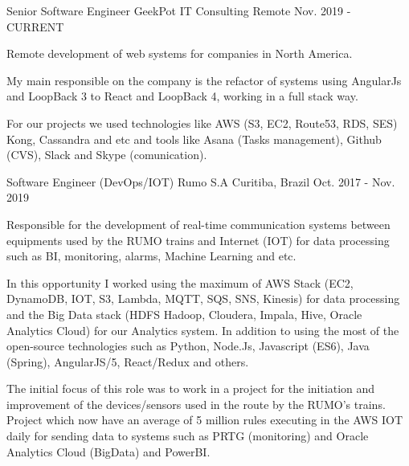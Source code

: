 

\begin{cventries}
  \cventry
    {Senior Software Engineer} %
    {GeekPot IT Consulting} %
    {Remote} %
    {Nov. 2019 - CURRENT} %
    {
    \begin{cvitems} %
        \item {
     Remote development of web systems for companies in North America.
       }
       \item {
       My main responsible on the company is the refactor of systems using AngularJs and LoopBack 3 to React and LoopBack 4, working in a full stack way.
       }
       \item {
       For our projects we used technologies like AWS (S3, EC2, Route53, RDS, SES) Kong, Cassandra and etc and tools like Asana (Tasks management), Github (CVS), Slack and Skype (comunication).
        }
      \end{cvitems}
    }
  \cventry
    { Software Engineer (DevOps/IOT)} %
    {Rumo S.A} %
    {Curitiba, Brazil} %
    {Oct. 2017 - Nov. 2019} %
    {
    \begin{cvitems} %
        \item {
Responsible for the development of real-time communication systems between equipments used by the RUMO trains and Internet (IOT) for data processing such as BI, monitoring, alarms, Machine Learning and etc.
}
       \item {In this opportunity I worked using the maximum of AWS Stack (EC2, DynamoDB, IOT, S3, Lambda, MQTT, SQS, SNS, Kinesis) for data processing and the Big Data stack (HDFS Hadoop, Cloudera, Impala, Hive, Oracle Analytics Cloud) for our Analytics system. In addition to using the most of the open-source technologies such as Python, Node.Js, Javascript (ES6), Java (Spring), AngularJS/5, React/Redux and others.}
        \item {The initial focus of this role was to work in a project for the initiation and improvement of the devices/sensors used in the route by the RUMO's trains. Project which now have an average of 5 million rules executing in the AWS IOT daily for sending data to systems such as PRTG (monitoring) and Oracle Analytics Cloud (BigData) and PowerBI.}

\end{cvitems}}
\end{cventries}
